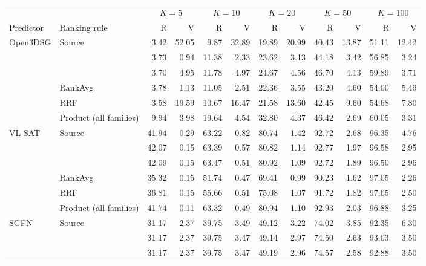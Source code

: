 \begin{table}[!t]
\centering
{\small
\setlength{\tabcolsep}{2.0pt}
\begin{tabular}{@{}llrrrrrrrrrr@{}}
\toprule
& & \multicolumn{2}{c}{$K=5$} & \multicolumn{2}{c}{$K=10$} &
\multicolumn{2}{c}{$K=20$} & \multicolumn{2}{c}{$K=50$} &
\multicolumn{2}{c}{$K=100$} \\
\cmidrule(lr){3-4}\cmidrule(lr){5-6}\cmidrule(lr){7-8}\cmidrule(lr){9-10}\cmidrule(lr){11-12}
Predictor & Ranking rule & R & V & R & V & R & V & R & V & R & V \\
\midrule
\multirow{6}{*}{Open3DSG}
& Source & 3.42 & 52.05 & 9.87 & 32.89 & 19.89 & 20.99 & 40.43 & 13.87 & 51.11 & 12.42 \\
& \textbf{\methodlinear{}} & 3.73 & 0.94 & 11.38 & 2.33 & 23.62 & 3.13 & 44.18 & 3.42 & 56.85 & 3.24 \\
& \textbf{\methodmlp{}} & 3.70 & 4.95 & 11.78 & 4.97 & 24.67 & 4.56 & 46.70 & 4.13 & 59.89 & 3.71 \\
& RankAvg & 3.78 & 1.13 & 11.05 & 2.51 & 22.36 & 3.55 & 43.20 & 4.60 & 54.00 & 5.49 \\
& RRF & 3.58 & 19.59 & 10.67 & 16.47 & 21.58 & 13.60 & 42.45 & 9.60 & 54.68 & 7.80 \\
& Product (all families) & 9.94 & 3.98 & 19.64 & 4.54 & 32.80 & 4.37 & 46.42 & 2.69 & 60.05 & 3.31 \\
\midrule
\multirow{6}{*}{VL-SAT}
& Source & 41.94 & 0.29 & 63.22 & 0.82 & 80.74 & 1.42 & 92.72 & 2.68 & 96.35 & 4.76 \\
& \textbf{\methodlinear{}} & 42.07 & 0.15 & 63.39 & 0.57 & 80.82 & 1.14 & 92.77 & 1.97 & 96.58 & 2.95 \\
& \textbf{\methodmlp{}} & 42.09 & 0.15 & 63.47 & 0.51 & 80.92 & 1.09 & 92.72 & 1.89 & 96.50 & 2.96 \\
& RankAvg & 35.32 & 0.15 & 51.74 & 0.47 & 69.41 & 0.99 & 90.23 & 1.62 & 97.05 & 2.26 \\
& RRF & 36.81 & 0.15 & 55.66 & 0.51 & 75.08 & 1.07 & 91.72 & 1.82 & 97.05 & 2.50 \\
& Product (all families) & 41.74 & 0.11 & 63.32 & 0.49 & 80.94 & 1.10 & 92.93 & 2.03 & 96.88 & 3.25 \\
\midrule
\multirow{6}{*}{SGFN}
& Source & 31.17 & 2.37 & 39.75 & 3.49 & 49.12 & 3.22 & 74.02 & 3.85 & 92.35 & 6.30 \\
& \textbf{\methodlinear{}} & 31.17 & 2.37 & 39.75 & 3.47 & 49.14 & 2.97 & 74.50 & 2.63 & 93.03 & 3.50 \\
& \textbf{\methodmlp{}} & 31.17 & 2.37 & 39.75 & 3.47 & 49.19 & 2.96 & 74.57 & 2.58 & 92.88 & 3.50 \\

\end{tabular}}
\end{table}
